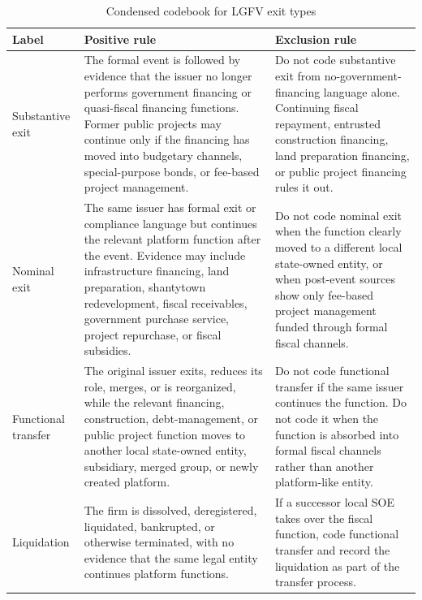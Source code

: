 \begin{table}[htbp]
\centering
\footnotesize
\setlength{\tabcolsep}{4pt}
\begin{tabular}{@{}>{\raggedright\arraybackslash}p{}>{\raggedright\arraybackslash}p{}>{\raggedright\arraybackslash}p{}@{}}
\toprule
Label & Positive rule & Exclusion rule \\
\midrule
Substantive exit & The formal event is followed by evidence that the issuer no
longer performs government financing or quasi-fiscal financing functions. Former
public projects may continue only if the financing has moved into budgetary
channels, special-purpose bonds, or fee-based project management. & Do not code
substantive exit from no-government-financing language alone. Continuing fiscal
repayment, entrusted construction financing, land preparation financing, or
public project financing rules it out. \\
Nominal exit & The same issuer has formal exit or compliance language but
continues the relevant platform function after the event. Evidence may include
infrastructure financing, land preparation, shantytown redevelopment, fiscal
receivables, government purchase service, project repurchase, or fiscal
subsidies. & Do not code nominal exit when the function clearly moved to a
different local state-owned entity, or when post-event sources show only
fee-based project management funded through formal fiscal channels. \\
Functional transfer & The original issuer exits, reduces its role, merges, or
is reorganized, while the relevant financing, construction, debt-management, or
public project function moves to another local state-owned entity, subsidiary,
merged group, or newly created platform. & Do not code functional transfer if
the same issuer continues the function. Do not code it when the function is
absorbed into formal fiscal channels rather than another platform-like entity.
\\
Liquidation & The firm is dissolved, deregistered, liquidated, bankrupted, or
otherwise terminated, with no evidence that the same legal entity continues
platform functions. & If a successor local SOE takes over the fiscal function,
code functional transfer and record the liquidation as part of the transfer
process. \\
\bottomrule
\end{tabular}
\caption{Condensed codebook for LGFV exit types}
\label{tab:condensed-codebook}
\end{table}


